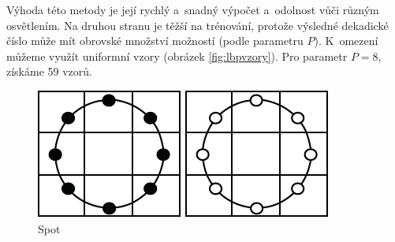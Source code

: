 Výhoda této metody je její rychlý a~snadný výpočet a~odolnost vůči různým osvětlením. Na druhou stranu je těžší na trénování, protože výsledné dekadické číslo může mít obrovské množství možností (podle parametru $P$). K~omezení můžeme využít uniformní vzory (obrázek \ref{fig:lbpvzory}). Pro parametr $P=8$, získáme 59 vzorů. 

\begin{figure}[H]
\centering
\begin{minipage}[b]{.18\textwidth}
  \centering
  \includegraphics[width=.9\linewidth]{figures/lbp_spot}
  \caption*{Spot}
\end{minipage}
\begin{minipage}[b]{.18\textwidth}
  \centering
  \includegraphics[width=.9\linewidth]{figures/lbp_spot_flat}

\end{minipage}
\end{figure}
